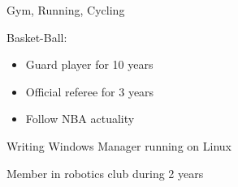 \documentclass[letterpaper]{jm-cv} %
\begin{document}


\small {

{\color{mainblue}\faSmileO} Gym, Running, Cycling

{\color{mainblue}\faUser} Basket-Ball:
{\footnotesize
\vspace{-0.2cm}
\begin{itemize}
\item[\color{maingray}\faArrowRight] Guard player for 10 years
\item[\color{maingray}\faArrowRight] Official referee for 3 years
\item[\color{maingray}\faArrowRight] Follow NBA actuality
\end{itemize}
}

{\color{mainblue}\faTerminal} Writing Windows Manager running on Linux

{\color{mainblue}\faCogs} Member in robotics club during 2 years

}
\end{document}
